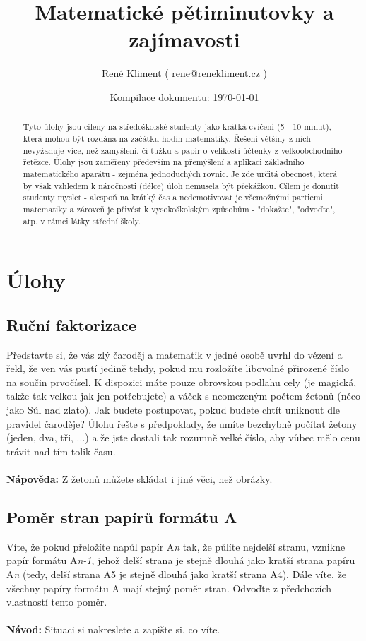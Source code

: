 \documentclass[a4paper,12pt]{article}
\author{
  René Kliment 
  ( \href{mailto:rene@renekliment.cz}{rene@renekliment.cz} )
}
\title{Matematické pětiminutovky a zajímavosti}
\date{Kompilace dokumentu: \today}
\begin{document}
 
\maketitle
 
\begin{abstract}
  Tyto úlohy jsou cíleny na středoškolské studenty jako krátká cvičení (5 - 10 minut), která mohou být rozdána na začátku hodin matematiky. Řešení většiny z nich nevyžaduje více, než zamyšlení, či tužku a papír o velikosti účtenky z velkoobchodního řetězce. Úlohy jsou zaměřeny především na přemýšlení a aplikaci základního matematického aparátu - zejména jednoduchých rovnic. Je zde určitá obecnost, která by však vzhledem k náročnosti (délce) úloh nemusela být překážkou. Cílem je donutit studenty myslet - alespoň na krátký čas a nedemotivovat je všemožnými partiemi matematiky a zároveň je přivést k vysokoškolským způsobům - "dokažte", "odvoďte", atp. v rámci látky střední školy. 
\end{abstract}

 
\section{Úlohy}

\subsection{Ruční faktorizace}

Představte si, že vás zlý čaroděj a matematik v jedné osobě uvrhl do vězení a řekl, že ven vás pustí jedině tehdy, pokud mu rozložíte libovolné přirozené číslo na součin prvočísel. K dispozici máte pouze obrovskou podlahu cely (je magická, takže tak velkou jak jen potřebujete) a váček s neomezeným počtem žetonů (něco jako Sůl nad zlato). Jak budete postupovat, pokud budete chtít uniknout dle pravidel čaroděje? Úlohu řešte s předpoklady, že umíte bezchybně počítat žetony (jeden, dva, tři, ...) a že jste dostali tak rozumně velké číslo, aby vůbec mělo cenu trávit nad tím tolik času. 
\\ \\
\textbf{Nápověda:} Z žetonů můžete skládat i jiné věci, než obrázky.

\subsection{Poměr stran papírů formátu A}
Víte, že pokud přeložíte napůl papír A\textit{n} tak, že půlíte nejdelší stranu, vznikne papír formátu A\textit{n-1}, jehož delší strana je stejně dlouhá jako kratší strana papíru A\textit{n} (tedy, delší strana A5 je stejně dlouhá jako kratší strana A4). Dále víte, že všechny papíry formátu A mají stejný poměr stran. Odvoďte z předchozích vlastností tento poměr.
\\ \\
\textbf{Návod:} Situaci si nakreslete a zapište si, co víte.
\end{document}
